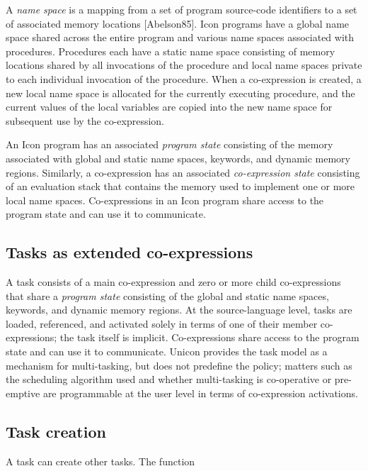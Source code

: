 A \textit{name space} is a mapping from a set of program source-code
identifiers to a set of associated memory locations [Abelson85]. Icon
programs have a global name space shared across the entire program and
various name spaces associated with procedures. Procedures each have a
static name space consisting of memory locations shared by all
invocations of the procedure and local name spaces private to each
individual invocation of the procedure.
When a co-expression is created, a new local name space is allocated for
the currently executing procedure, and the current values of the local
variables are copied into the new name space for subsequent use by the
co-expression. 

An Icon program has an associated \textit{program state} consisting of
the memory associated with global and static name spaces, keywords, and
dynamic memory regions. Similarly, a co-expression has an associated
\textit{co-expression state} consisting of an evaluation stack that
contains the memory used to implement one or more local name spaces.
Co-expressions in an Icon program share access to the program state and
can use it to communicate. 

\subsection*{Tasks as extended co-expressions}

A task consists of a main co-expression and zero or more child
co-expressions that share a {\em program state\/} 
consisting of the global and static name
spaces, keywords, and dynamic memory regions. At the source-language
level, tasks are loaded, referenced, and activated solely in terms of
one of their member co-expressions; the task itself is implicit.
Co-expressions share access to the program state and can use it to
communicate.
Unicon provides the task model as a mechanism for multi-tasking, but does
not predefine the policy; matters such as the scheduling algorithm used and
whether multi-tasking is co-operative or pre-emptive are programmable at the
user level in terms of co-expression activations.


\subsection*{Task creation}

A task can create other tasks. The function 


